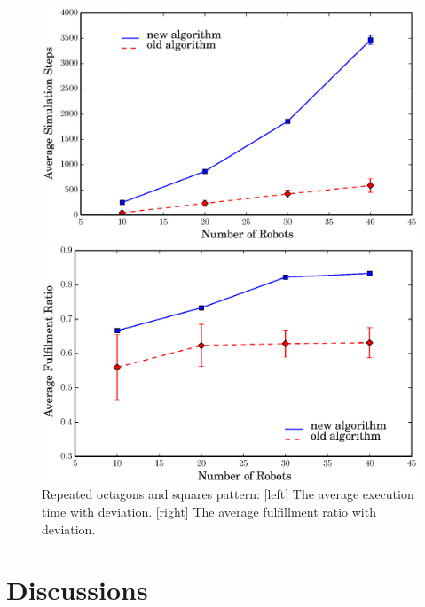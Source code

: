   \begin{figure}
  \centering 
    \begin{minipage}[b]{0.75\linewidth}
    \centering 
      \includegraphics[trim=0.5cm 0cm 1.5cm 0,clip=true,width=\linewidth]{figs/steps_octagon_square}
    \end{minipage}
    \begin{minipage}[b]{0.75\linewidth}
    \centering 
      \includegraphics[trim=0.5cm 0 1.5cm 0,clip=true,width=\linewidth]{figs/ratio_octagon_square}
    \end{minipage}
    \caption{Repeated octagons and squares pattern: [left] The average execution time with deviation. [right] The average fulfillment ratio with deviation.}
    \label{fig:octsq_comp}
  \end{figure}
  
\section{Discussions}
\label{sec:conc-mrf2}

